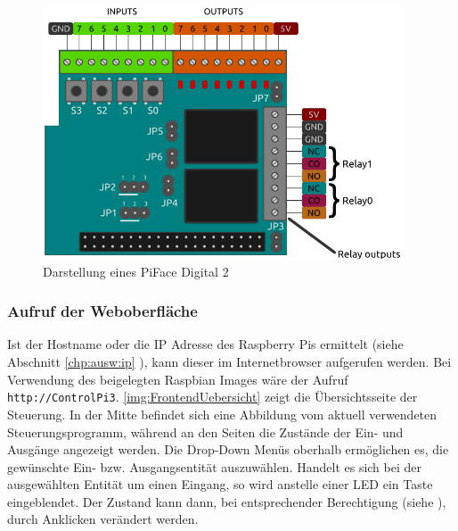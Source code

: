  
 \begin{figure}[H]
 	\begin{center}
 		\includegraphics[width=0.95\textwidth]{./images/pifacedigital2_diagram.png}
 		\caption[Darstellung eines PiFace Digital 2]{Darstellung eines PiFace Digital 2\cite{URL:Pfd}}
 		\label{img:PiFaceDigital2}
 	\end{center} 
 \end{figure}	

 \subsubsection{Aufruf der Weboberfläche}\label{chp:FrontendUebersicht}
Ist der Hostname oder die IP Adresse des Raspberry Pis ermittelt (siehe Abschnitt \ref{chp:ausw:ip} ), kann dieser im Internetbrowser aufgerufen werden. Bei Verwendung des beigelegten Raspbian Images wäre der Aufruf \texttt{http://ControlPi3}. \autoref{img:FrontendUebersicht} zeigt die Übersichtsseite der Steuerung. In der Mitte befindet sich eine Abbildung vom aktuell verwendeten Steuerungsprogramm, während an den Seiten die Zustände der Ein- und Ausgänge angezeigt werden. Die Drop-Down Menüs oberhalb ermöglichen es, die gewünschte Ein- bzw. Ausgangsentität auszuwählen. Handelt es sich bei der ausgewählten Entität um einen Eingang, so wird anstelle einer LED ein Taste eingeblendet. Der Zustand kann dann, bei entsprechender Berechtigung (siehe ), durch Anklicken verändert werden.  

